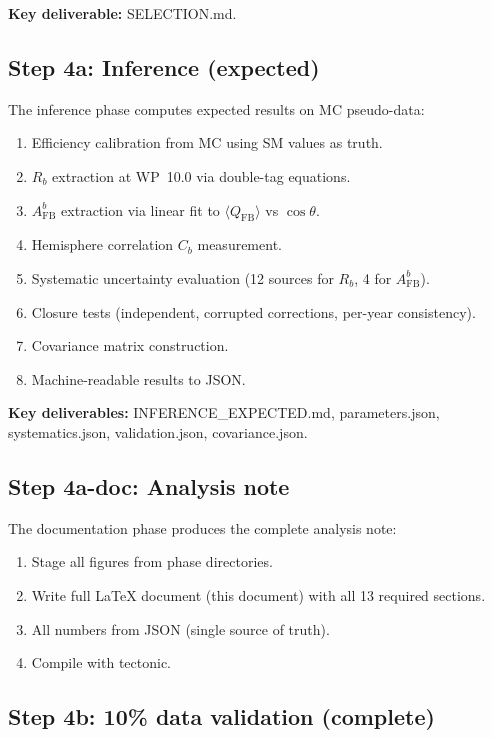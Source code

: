 \documentclass[11pt,a4paper]{article}
\begin{document}
\textbf{Key deliverable:} SELECTION.md.

\subsection{Step 4a: Inference (expected)}

The inference phase computes expected results on MC pseudo-data:
\begin{enumerate}
\item Efficiency calibration from MC using SM values as truth.
\item $R_b$ extraction at WP~10.0 via double-tag equations.
\item $A_\mathrm{FB}^b$ extraction via linear fit to $\langle Q_\mathrm{FB} \rangle$
vs $\cos\theta$.
\item Hemisphere correlation $C_b$ measurement.
\item Systematic uncertainty evaluation (12 sources for $R_b$, 4 for $A_\mathrm{FB}^b$).
\item Closure tests (independent, corrupted corrections, per-year consistency).
\item Covariance matrix construction.
\item Machine-readable results to JSON.
\end{enumerate}

\textbf{Key deliverables:} INFERENCE\_EXPECTED.md, parameters.json, systematics.json,
validation.json, covariance.json.

\subsection{Step 4a-doc: Analysis note}

The documentation phase produces the complete analysis note:
\begin{enumerate}
\item Stage all figures from phase directories.
\item Write full LaTeX document (this document) with all 13 required sections.
\item All numbers from JSON (single source of truth).
\item Compile with tectonic.
\end{enumerate}

\subsection{Step 4b: 10\% data validation (complete)}
\end{document}

